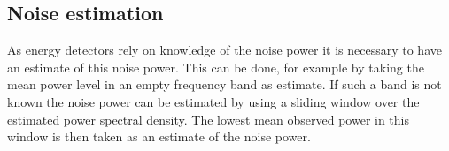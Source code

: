 \documentclass[a4paper, openany, oneside]{memoir}
\begin{document}
\subsection{Noise estimation}
As energy detectors rely on knowledge of the noise power it is necessary to have an estimate of this noise power. This can be done,
for example by taking the mean power level in an empty frequency band as estimate. If such a band is not known the noise power can be estimated by using a sliding window over the estimated power spectral density. The lowest mean observed power in this window is then taken
as an estimate of the noise power.

\end{document}
